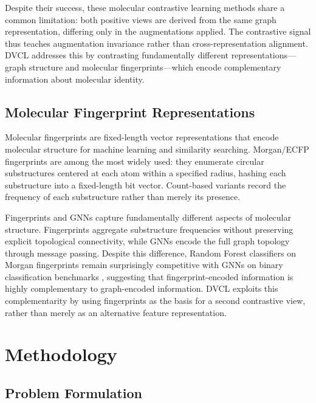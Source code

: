 \documentclass[a4paper,fleqn]{cas-sc}
\begin{document}
Despite their success, these molecular contrastive learning methods share a common limitation: both positive views are derived from the same graph representation, differing only in the augmentations applied. The contrastive signal thus teaches augmentation invariance rather than cross-representation alignment. DVCL addresses this by contrasting fundamentally different representations---graph structure and molecular fingerprints---which encode complementary information about molecular identity.

\subsection{Molecular Fingerprint Representations}

Molecular fingerprints are fixed-length vector representations that encode molecular structure for machine learning and similarity searching. Morgan/ECFP fingerprints \citep{rogers2010extended} are among the most widely used: they enumerate circular substructures centered at each atom within a specified radius, hashing each substructure into a fixed-length bit vector. Count-based variants record the frequency of each substructure rather than merely its presence.

Fingerprints and GNNs capture fundamentally different aspects of molecular structure. Fingerprints aggregate substructure frequencies without preserving explicit topological connectivity, while GNNs encode the full graph topology through message passing. Despite this difference, Random Forest classifiers on Morgan fingerprints remain surprisingly competitive with GNNs on binary classification benchmarks \citep{yang2019analyzing}, suggesting that fingerprint-encoded information is highly complementary to graph-encoded information. DVCL exploits this complementarity by using fingerprints as the basis for a second contrastive view, rather than merely as an alternative feature representation.


\section{Methodology}\label{sec:method}

\subsection{Problem Formulation}\label{sec:problem}
\end{document}
